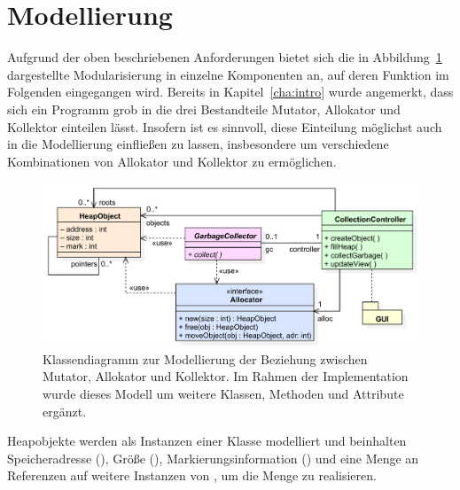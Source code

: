 \section{Modellierung}
\label{sec:model}
Aufgrund der oben beschriebenen Anforderungen bietet sich die in Abbildung~\ref{fig:model} dargestellte Modularisierung in einzelne Komponenten an, auf deren Funktion im Folgenden eingegangen wird.
Bereits in Kapitel~\ref{cha:intro} wurde angemerkt, dass sich ein Programm grob in die drei Bestandteile Mutator, Allokator und Kollektor einteilen lässt.
Insofern ist es sinnvoll, diese Einteilung möglichst auch in die Modellierung einfließen zu lassen, insbesondere um verschiedene Kombinationen von Allokator und Kollektor zu ermöglichen.

\begin{figure}[h]
	\centering
	\includegraphics[scale=0.6]{img/uml/ch7-model.pdf}
	\caption[Klassendiagramm zur Modellierung von Mutator, Allokator, Kollektor]{Klassendiagramm zur Modellierung der Beziehung zwischen Mutator, Allokator und Kollektor. Im Rahmen der Implementation wurde dieses Modell um weitere Klassen, Methoden und Attribute ergänzt.}
	\label{fig:model}
\end{figure}

Heapobjekte werden als Instanzen einer Klasse  modelliert und beinhalten Speicheradresse (), Größe (), Markierungsinformation () und eine Menge  an Referenzen auf weitere Instanzen von , um die Menge \Pointers zu realisieren.

